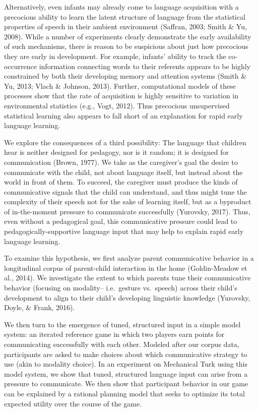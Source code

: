 \documentclass[10pt, letterpaper]{article}
\begin{document}
Alternatively, even infants may already come to language acquisition
with a precocious ability to learn the latent structure of language from
the statistical properties of speech in their ambient environment
(Saffran, 2003; Smith \& Yu, 2008). While a number of experiments
clearly demonstrate the early availability of such mechanisms, there is
reason to be suspicious about just how precocious they are early in
development. For example, infants' ability to track the co-occurrence
information connecting words to their referents appears to be highly
constrained by both their developing memory and attention systems (Smith
\& Yu, 2013; Vlach \& Johnson, 2013). Further, computational models of
these processes show that the rate of acquisition is highly sensitive to
variation in environmental statistics (e.g., Vogt, 2012). Thus
precocious unsupervised statistical learning also appears to fall short
of an explanation for rapid early language learning.

We explore the consequences of a third possibility: The language that
children hear is neither designed for pedagogy, nor is it random; it is
designed for communication (Brown, 1977). We take as the caregiver's
goal the desire to communicate with the child, not about language
itself, but instead about the world in front of them. To succeed, the
caregiver must produce the kinds of communicative signals that the child
can understand, and thus might tune the complexity of their speech not
for the sake of learning itself, but as a byproduct of in-the-moment
pressure to communicate successfully (Yurovsky, 2017). Thus, even
without a pedagogical goal, this communicative pressure could lead to
pedagogically-supportive language input that may help to explain rapid
early language learning.

To examine this hypothesis, we first analyze parent communicative
behavior in a longitudinal corpus of parent-child interaction in the
home (Goldin-Meadow et al., 2014). We investigate the extent to which
parents tune their communicative behavior (focusing on modality--
i.e.~gesture vs.~speech) across their child's development to align to
their child's developing linguistic knowledge (Yurovsky, Doyle, \&
Frank, 2016).

We then turn to the emergence of tuned, structured input in a simple
model system: an iterated reference game in which two players earn
points for communicating successfully with each other. Modeled after our
corpus data, participants are asked to make choices about which
communicative strategy to use (akin to modality choice). In an
experiment on Mechanical Turk using this model system, we show that
tuned, structured language input can arise from a pressure to
communicate. We then show that participant behavior in our game can be
explained by a rational planning model that seeks to optimize its total
expected utility over the course of the game.
\end{document}
